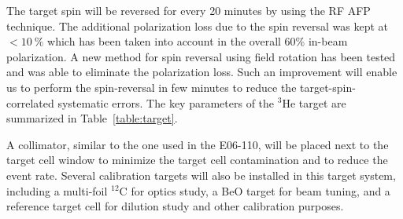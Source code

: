 The target spin will be reversed for every 20 minutes by using the RF AFP
technique. The additional polarization loss due to the spin reversal was kept
at $<10~\%$ which has been taken into account in the overall 60\% in-beam
polarization. A new method for spin reversal using field rotation has been
tested and was able to eliminate the polarization loss. Such an improvement
will enable us to perform the spin-reversal in few minutes to reduce the
target-spin-correlated systematic errors. The key parameters of the
$\mathrm{^{3}He}$ target are summarized in Table~\ref{table:target}.
  
A collimator, similar to the one used in the E06-110, will be placed next to
the target cell window to minimize the target cell contamination and to reduce
the event rate. Several calibration targets will also be installed in this
target system, including a multi-foil $^{12}$C for optics study, a BeO target
for beam tuning, and a reference target cell for dilution study and other
calibration purposes.
  

